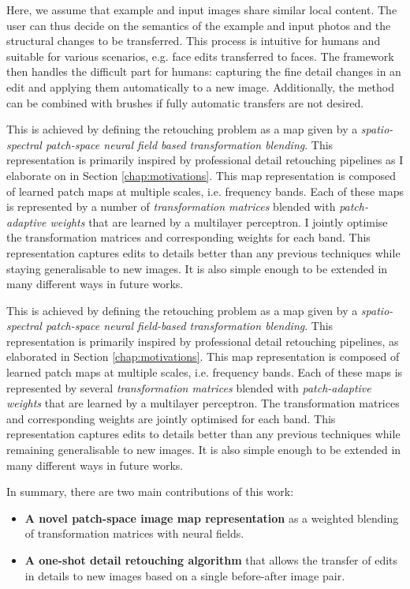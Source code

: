 Here, we assume that example and input images share similar local content. The user can thus decide on the semantics of the example and input photos and the structural changes to be transferred. This process is intuitive for humans and suitable for various scenarios, e.g. face edits transferred to faces. The framework then handles the difficult part for humans: capturing the fine detail changes in an edit and applying them automatically to a new image. Additionally, the method can be combined with brushes if fully automatic transfers are not desired.

This is achieved by defining the retouching problem as a map given by a \emph{spatio-spectral patch-space neural field based transformation blending}. This representation is primarily inspired by professional detail retouching pipelines as I elaborate on in Section \ref{chap:motivations}. This map representation is composed of learned patch maps at multiple scales, i.e. frequency bands. Each of these maps is represented by a number of \emph{transformation matrices} blended with \emph{patch-adaptive weights} that are learned by a multilayer perceptron. I jointly optimise the transformation matrices and corresponding weights for each band. This representation captures edits to details better than any previous techniques while staying generalisable to new images. It is also simple enough to be extended in many different ways in future works.

This is achieved by defining the retouching problem as a map given by a \emph{spatio-spectral patch-space neural field-based transformation blending}. This representation is primarily inspired by professional detail retouching pipelines, as elaborated in Section \ref{chap:motivations}. This map representation is composed of learned patch maps at multiple scales, i.e. frequency bands. Each of these maps is represented by several \emph{transformation matrices} blended with \emph{patch-adaptive weights} that are learned by a multilayer perceptron. The transformation matrices and corresponding weights are jointly optimised for each band. This representation captures edits to details better than any previous techniques while remaining generalisable to new images. It is also simple enough to be extended in many different ways in future works.

In summary, there are two main contributions of this work: 

\begin{itemize}

    \item \textbf{A novel patch-space image map representation} as a weighted blending of transformation matrices with neural fields.
    
	\item \textbf{A one-shot detail retouching algorithm} that allows the transfer of edits in details to new images based on a single before-after image pair.

\end{itemize}
